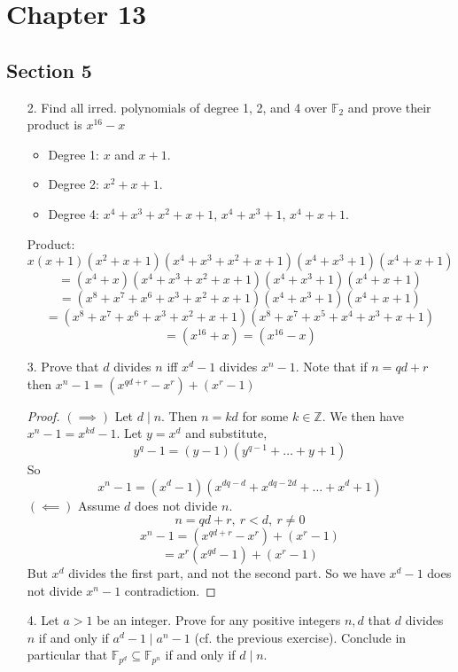 \documentclass[hidelinks,12pt]{article}
\title{\scalebox{2}{Math 835 Homework 5}}
\author{\scalebox{1.5}{Theo Koss}}
\date{October 2024}
\newcommand{\Z}{\mathbb{Z}}
\newcommand{\F}{\mathbb{F}}
\begin{document}
\maketitle
\section*{Chapter 13}
\subsection*{Section 5}
\begin{enumerate}
    \item[2.] Find all irred. polynomials of degree 1, 2, and 4 over \(\F_{2}\) and prove their product is \(x^{16}-x\)\begin{itemize}
        \item Degree 1: \(x\) and \(x+1\).
        \item Degree 2: \(x^{2}+x+1\).
        \item Degree 4: \(x^{4}+x^{3}+x^{2}+x+1\), \(x^{4}+x^{3}+1\), \(x^{4}+x+1\).
    \end{itemize} 
    Product:\[
        x(x+1)(x^{2}+x+1)(x^{4}+x^{3}+x^{2}+x+1)(x^{4}+x^{3}+1)(x^{4}+x+1)
    \]
    \[
    =(x^{4}+x)(x^{4}+x^{3}+x^{2}+x+1)(x^{4}+x^{3}+1)(x^{4}+x+1)
    \]
    \[
    =(x^{8}+x^{7}+x^{6}+x^{3}+x^{2}+x+1)(x^{4}+x^{3}+1)(x^{4}+x+1)
    \]
   \[
   =(x^{8}+x^{7}+x^{6}+x^{3}+x^{2}+x+1)(x^{8}+x^{7}+x^{5}+x^{4}+x^{3}+x+1)
   \]
   \[
   =(x^{16}+x)=(x^{16}-x)
   \] 
    \item[3.] Prove that \(d\) divides \(n\) iff \(x^{d}-1\) divides \(x^{n}-1\). Note that if \(n=qd+r\) then \(x^{n}-1=(x^{qd+r}-x^{r})+(x^{r}-1)\) 
        \begin{proof}
        \((\implies)\) Let \(d\mid n\). Then \(n=kd\) for some \(k\in\Z\). We then have \(x^{n}-1=x^{kd}-1\). Let \(y=x^{d}\) and substitute,
        \[
        y^{q}-1=(y-1)(y^{q-1}+\dots+y+1)
        \]
       So \[
       x^{n}-1=(x^{d}-1)(x^{dq-d}+x^{dq-2d}+\dots+x^{d}+1)
       \]
        \((\impliedby)\) Assume \(d\) does not divide \(n\). \[
        n=qd+r,\ r<d,\ r\neq0
        \]
       \[
       x^{n}-1=(x^{qd+r}-x^{r})+(x^{r}-1)
       \]
       \[
       =x^{r}(x^{qd}-1)+(x^{r}-1)
       \]
       But \(x^{d}\) divides the first part, and not the second part. So we have \(x^{d}-1\) does not divide \(x^{n}-1\) contradiction. 
        \end{proof}
    \item[4.] Let \(a>1\) be an integer. Prove for any positive integers \(n,d\) that \(d\) divides \(n\) if and only if \(a^{d}-1\mid a^{n}-1\) (cf. the previous exercise). Conclude in particular that \(\F_{p^{d}}\subseteq\F_{p^{n}}\) if and only if \(d\mid n\).

\end{enumerate}
\end{document}
